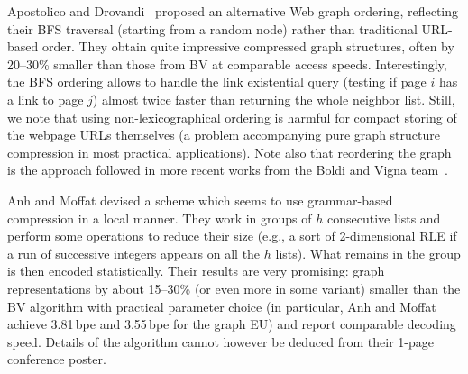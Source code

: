 \documentclass[envcountsame]{llncs}
\begin{document}
Apostolico and Drovandi~\cite{AD09} proposed an alternative Web graph 
ordering, reflecting their BFS traversal (starting from a random node) rather 
than traditional URL-based order.
They obtain quite impressive compressed graph structures, often by 20--30\% smaller 
than those from BV at comparable access speeds.
Interestingly, the BFS ordering allows to handle the link existential query 
(testing if page $i$ has a link to page $j$) almost twice faster than returning 
the whole neighbor list.
Still, we note that using non-lexicographical ordering is harmful 
for compact storing of the webpage URLs themselves (a problem accompanying pure 
graph structure compression in most practical applications).
Note also that reordering the graph is the approach followed in more recent 
works from the Boldi and Vigna team~\cite{BSV09,BoldiRSV11}.

Anh and Moffat \cite{DBLP:conf/dcc/AnhM10} devised a scheme which seems to use 
grammar-based compression in a local manner. They work in groups of $h$ consecutive 
lists and perform some operations to reduce their size (e.g., a sort of 2-dimensional 
RLE if a run of successive integers appears on all the $h$ lists).  What remains 
in the group is then encoded statistically.  Their results are very promising: 
graph representations by about 15--30\% (or even more in some variant) smaller 
than the BV algorithm with practical parameter choice (in particular, 
Anh and Moffat achieve 3.81\,bpe and 3.55\,bpe for the graph EU) and report 
comparable decoding speed.
Details of the algorithm cannot however be deduced 
from their 1-page conference poster.
\end{document}
